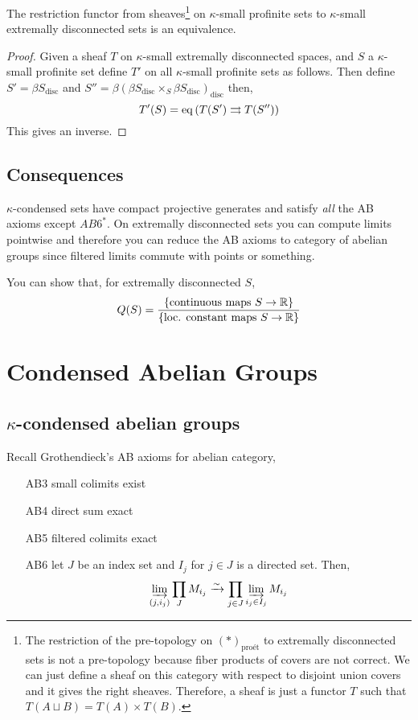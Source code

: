 \documentclass[12pt]{article}
\newcommand{\proet}{\text{pro\'{e}t}}
\newcommand{\disc}{\text{disc}}
\begin{document}
\begin{prop}
The restriction functor from sheaves\footnote{The restriction of the pre-topology on $(*)_{\proet}$ to extremally disconnected sets is not a pre-topology because fiber products of covers are not correct. We can just define a sheaf on this category with respect to disjoint union covers and it gives the right sheaves. Therefore, a sheaf is just a functor $T$ such that $T(A \sqcup B) = T(A) \times T(B)$.} on $\kappa$-small profinite sets to $\kappa$-small extremally disconnected sets is an equivalence. 
\end{prop}

\begin{proof}
Given a sheaf $T$ on $\kappa$-small extremally disconnected spaces, and $S$ a $\kappa$-small profinite set define $T'$ on all $\kappa$-small profinite sets as follows. Then define $S' = \beta S_{\disc}$ and $S'' = \beta(\beta S_{\disc} \times_S \beta S_{\disc})_{\disc}$ then,
\[ T'(S) = \operatorname{\mathrm{eq}} \left( T(S') \rightrightarrows T(S'') \right) \]
This gives an inverse.
\end{proof}

\subsection{Consequences}

$\kappa$-condensed sets have compact projective generates and satisfy \textit{all} the AB axioms except $AB6^*$. On extremally disconnected sets you can compute limits pointwise and therefore you can reduce the AB axioms to category of abelian groups since filtered limits commute with points or something.


\begin{example}
You can show that, for extremally disconnected $S$,
\[ Q(S) = \frac{ \{ \text{continuous maps } S \to \mathbb{R} \} }{ \{ \text{loc. constant maps } S \to \mathbb{R}  \}} \]
\end{example}

\section{Condensed Abelian Groups}

\subsection{$\kappa$-condensed abelian groups}

Recall Grothendieck's AB axioms for abelian category,
\begin{enumerate}
\item[AB3] small colimits exist
\item[AB4] direct sum exact
\item[AB5] filtered colimits exact
\item[AB6] let $J$ be an index set and $I_j$ for $j \in J$ is a directed set. Then,
\[ \operatorname*{\varinjlim}_{(j, i_j)} \prod_J M_{i_j} \xrightarrow{\sim} \prod_{j \in J} \operatorname*{\varinjlim}_{i_j \in I_j} M_{i_j} \]
\end{enumerate}
\end{document}
